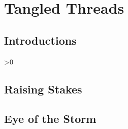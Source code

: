 \documentclass[a4paper,openany]{book}
\begin{document}
%

\glsunsetall


\printglossary[
  style=topicmcols,
]

\pagebreak
\printglossary[
  type=symbols,
  ]

\printglossary[
  type=mech,
  style=topicmcols,
  ]

\mainmatter




\glsresetall
{}
\clearpage


\chapter{Tangled Threads}

\section{Introductions}
\begin{multicols}{2}
\ifnum\value{temperature}>0
  
  
  
  
\else
  
  
  
  
\fi
\end{multicols}

\pagebreak
\section{Raising Stakes}
\begin{multicols}{2}
%


\end{multicols}

\section{Eye of the Storm}

\begin{multicols}{2}


\end{multicols}


\begin{multicols}{2}


\end{multicols}
\end{document}
